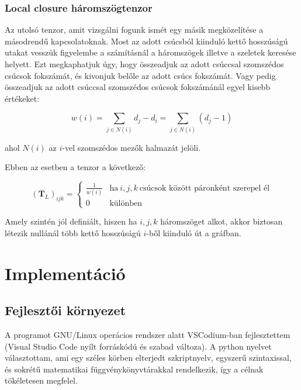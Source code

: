 \documentclass[12pt,numbers=noenddot]{report}
\begin{document}
\pagebreak

\subsection*{Local closure háromszögtenzor}

Az utolsó tenzor, amit vizsgálni fogunk ismét egy másik megközelítése a 
másodrendű kapcsolatoknak.
Most az adott csúcsból kiinduló kettő hosszúságú utakat vesszük figyelembe a
számításnál a háromszögek illetve a szeletek keresése helyett.
Ezt megkaphatjuk úgy, hogy összeadjuk az adott csúccsal szomszédos csúcsok 
fokszámát, és kivonjuk belőle az adott csúcs fokszámát.
Vagy pedig összeadjuk az adott csúccsal szomszédos csúcsok fokszámánál egyel
kisebb értékeket:

$$w(i) = \sum_{j \in N(i)} d_j - d_i = \sum_{j \in N(i)} (d_j - 1)$$

ahol $N(i)$ az $i$-vel szomszédos mezők halmazát jelöli.

Ebben az esetben a tenzor a következő:

\begin{equation}
	(\boldsymbol{T}_L)_{ijk} = 
		\begin{cases}
			\frac{1}{w(i)} & \text{ha} ~ i, j, k ~ \text{csúcsok között páronként szerepel él} \\
			0 & \text{különben}
		\end{cases}
\end{equation}

Amely szintén jól definiált, hiszen ha $i, j, k$ háromszöget alkot, akkor 
biztosan létezik nullánál több kettő hosszúságú $i$-ből kiinduló út a gráfban.


\chapter{Implementáció}

\section{Fejlesztői környezet}

A programot GNU/Linux operácios rendszer alatt VSCodium-ban fejlesztettem 
(Visual Studio Code nyílt forráskódú és szabad változa). A python nyelvet \cite{python}
választottam, ami egy széles körben elterjedt szkriptnyelv, egyszerű 
szintaxissal, és sokrétű matematikai függvénykönyvtárakkal rendelkezik,
így a célnak tökéletesen megfelel.
\end{document}
